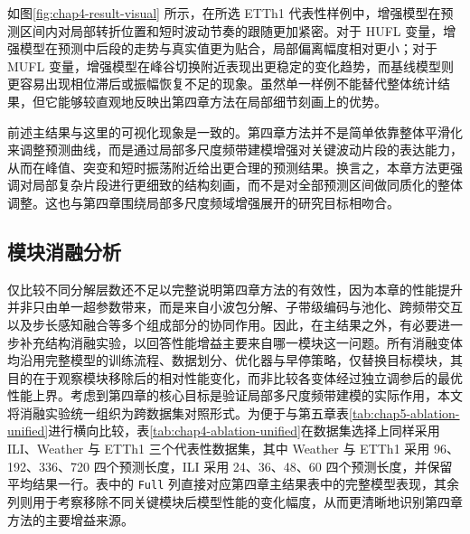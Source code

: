 如图\ref{fig:chap4-result-visual} 所示，在所选 ETTh1 代表性样例中，增强模型在预测区间内对局部转折位置和短时波动节奏的跟随更加紧密。对于 HUFL 变量，增强模型在预测中后段的走势与真实值更为贴合，局部偏离幅度相对更小；对于 MUFL 变量，增强模型在峰谷切换附近表现出更稳定的变化趋势，而基线模型则更容易出现相位滞后或振幅恢复不足的现象。虽然单一样例不能替代整体统计结果，但它能够较直观地反映出第四章方法在局部细节刻画上的优势。

前述主结果与这里的可视化现象是一致的。第四章方法并不是简单依靠整体平滑化来调整预测曲线，而是通过局部多尺度频带建模增强对关键波动片段的表达能力，从而在峰值、突变和短时振荡附近给出更合理的预测结果。换言之，本章方法更强调对局部复杂片段进行更细致的结构刻画，而不是对全部预测区间做同质化的整体调整。这也与第四章围绕局部多尺度频域增强展开的研究目标相吻合。

\subsection{模块消融分析} 仅比较不同分解层数还不足以完整说明第四章方法的有效性，因为本章的性能提升并非只由单一超参数带来，而是来自小波包分解、子带级编码与池化、跨频带交互以及步长感知融合等多个组成部分的协同作用。因此，在主结果之外，有必要进一步补充结构消融实验，以回答性能增益主要来自哪一模块这一问题。所有消融变体均沿用完整模型的训练流程、数据划分、优化器与早停策略，仅替换目标模块，其目的在于观察模块移除后的相对性能变化，而非比较各变体经过独立调参后的最优性能上界。考虑到第四章的核心目标是验证局部多尺度频带建模的实际作用，本文将消融实验统一组织为跨数据集对照形式。为便于与第五章表\ref{tab:chap5-ablation-unified}进行横向比较，表\ref{tab:chap4-ablation-unified}在数据集选择上同样采用 ILI、Weather 与 ETTh1 三个代表性数据集，其中 Weather 与 ETTh1 采用 96、192、336、720 四个预测长度，ILI 采用 24、36、48、60 四个预测长度，并保留平均结果一行。表中的 \texttt{Full} 列直接对应第四章主结果表中的完整模型表现，其余列则用于考察移除不同关键模块后模型性能的变化幅度，从而更清晰地识别第四章方法的主要增益来源。 
